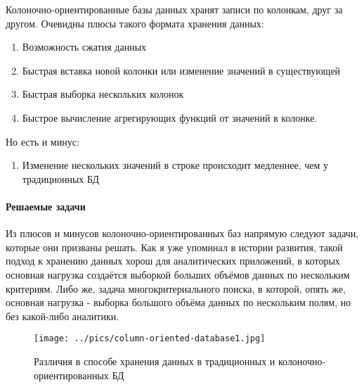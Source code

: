 \documentclass{matmex-diploma}
\begin{document}
        Колоночно-ориентированные базы данных хранят записи по колонкам, друг за другом.  Очевидны плюсы такого формата хранения данных:
        \begin{enumerate}
            \item Возможность сжатия данных
            \item Быстрая вставка новой колонки или изменение значений в существующей
            \item Быстрая выборка нескольких колонок
            \item Быстрое вычисление агрегирующих функций от значений в колонке.
        \end{enumerate}
        Но есть и минус:
        \begin{enumerate}
            \item Изменение нескольких значений в строке происходит медленнее, чем у традиционных БД
        \end{enumerate}
    \paragraph{Решаемые задачи} 
        Из плюсов и минусов колоночно-ориентированных баз напрямую следуют задачи, которые они призваны решать. Как я уже упоминал в истории развития, такой подход к хранению данных хорош для аналитических приложений, в которых основная нагрузка создаётся выборкой больших объёмов данных по нескольким критериям. Либо же, задача многокритериального поиска, в которой, опять же, основная нагрузка - выборка большого объёма данных по нескольким полям, но без какой-либо аналитики.
        \begin{figure}[h]
            \label{architecture_diff}
            \centering
            \texttt{[image: ../pics/column-oriented-database1.jpg]}
            \caption{Различия в способе хранения данных в традиционных и колоночно-ориентированных БД}
        \end{figure}
\end{document}

